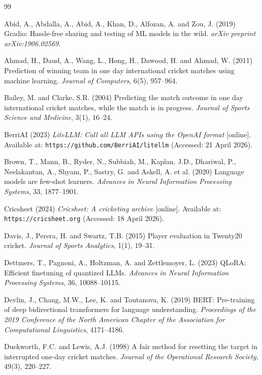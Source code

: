 \documentclass[12pt, oneside]{report}
\begin{document}
\clearpage
{}
\begin{thebibliography}{99}

Abid, A., Abdalla, A., Abid, A., Khan, D., Alfozan, A. and Zou, J. (2019)
Gradio: Hassle-free sharing and testing of ML models in the wild.
\textit{arXiv preprint arXiv:1906.02569}.

Ahmad, H., Daud, A., Wang, L., Hong, H., Dawood, H. and Ahmad, W. (2011)
Prediction of winning team in one day international cricket matches using machine learning.
\textit{Journal of Computers}, 6(5), 957--964.

Bailey, M. and Clarke, S.R. (2004)
Predicting the match outcome in one day international cricket matches, while the match is in progress.
\textit{Journal of Sports Science and Medicine}, 3(1), 16--24.

BerriAI (2023)
\textit{LiteLLM: Call all LLM APIs using the OpenAI format} [online].
Available at: \texttt{https://github.com/BerriAI/litellm} (Accessed: 21 April 2026).

Brown, T., Mann, B., Ryder, N., Subbiah, M., Kaplan, J.D., Dhariwal, P., Neelakantan, A., Shyam, P., Sastry, G. and Askell, A. et al. (2020)
Language models are few-shot learners.
\textit{Advances in Neural Information Processing Systems}, 33, 1877--1901.

Cricsheet (2024)
\textit{Cricsheet: A cricketing archive} [online].
Available at: \texttt{https://cricsheet.org} (Accessed: 18 April 2026).

Davis, J., Perera, H. and Swartz, T.B. (2015)
Player evaluation in Twenty20 cricket.
\textit{Journal of Sports Analytics}, 1(1), 19--31.

Dettmers, T., Pagnoni, A., Holtzman, A. and Zettlemoyer, L. (2023)
QLoRA: Efficient finetuning of quantized LLMs.
\textit{Advances in Neural Information Processing Systems}, 36, 10088--10115.

Devlin, J., Chang, M.W., Lee, K. and Toutanova, K. (2019)
BERT: Pre-training of deep bidirectional transformers for language understanding.
\textit{Proceedings of the 2019 Conference of the North American Chapter of the Association for Computational Linguistics}, 4171--4186.

Duckworth, F.C. and Lewis, A.J. (1998)
A fair method for resetting the target in interrupted one-day cricket matches.
\textit{Journal of the Operational Research Society}, 49(3), 220--227.


\end{thebibliography}
\end{document}
